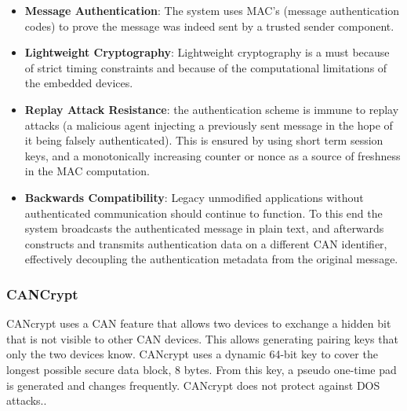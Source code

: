\documentclass[master=cws,masteroption=vs,english]{kulemt}
\begin{document}
\begin{itemize}
	\item \textbf{Message Authentication}: The system uses MAC's (message authentication codes) to prove the message was indeed sent by a trusted sender component.\cite{VulCAN}
	
	\item \textbf{Lightweight Cryptography}: Lightweight cryptography is a must because of strict timing constraints and because of the computational limitations of the embedded devices.\cite{VulCAN}
	
	\item \textbf{Replay Attack Resistance}: the authentication scheme is immune to replay attacks (a malicious agent injecting a previously sent message in the hope of it being falsely authenticated). This is ensured by using short term session keys, and a monotonically increasing counter or nonce as a source of freshness in the MAC computation.\cite{VulCAN}
	
	\item \textbf{Backwards Compatibility}: Legacy unmodified applications without authenticated communication should continue to function. To this end the system broadcasts the authenticated message in plain text, and afterwards constructs and transmits authentication data on a different CAN identifier, effectively decoupling the authentication metadata from the original message.\cite{VulCAN}
\end{itemize}

\subsubsection{CANCrypt} CANcrypt uses a CAN feature that allows two devices to exchange a hidden bit that is not visible to other CAN devices. This allows generating pairing keys that only the two devices know. CANcrypt uses a dynamic 64-bit key to cover the longest possible secure data block, 8 bytes. From this key, a pseudo one-time pad is generated and changes frequently. CANcrypt does not protect against DOS attacks.\cite{Pfeiffer}.
\end{document}
